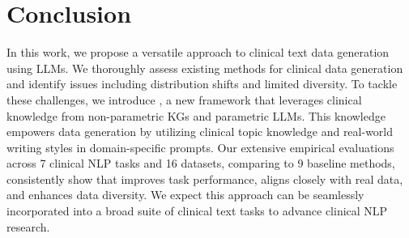 \section{Conclusion}

In this work, we propose a versatile approach to clinical text data generation using LLMs. We thoroughly assess existing methods for clinical data generation and identify issues including distribution shifts and limited diversity. To tackle these challenges, we introduce {\ours}, a new framework that leverages clinical knowledge from non-parametric KGs and parametric LLMs. This knowledge empowers data generation by utilizing clinical topic knowledge and real-world writing styles in domain-specific prompts. Our extensive empirical evaluations across 7 clinical NLP tasks and 16 datasets, comparing to 9 baseline methods, consistently show that {\ours} improves task performance, aligns closely with real data, and enhances data diversity. We expect this approach can be seamlessly incorporated into a broad suite of clinical text tasks to advance clinical NLP research.